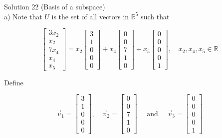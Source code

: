 \documentclass[10pt]{article}
\begin{document}
Solution 22 (Basis of a subspace)\\
a) Note that $U$ is the set of all vectors in $\mathbb{R}^{5}$ such that

$$
\left[\begin{array}{c}
3 x_{2} \\
x_{2} \\
7 x_{4} \\
x_{4} \\
x_{5}
\end{array}\right]=x_{2}\left[\begin{array}{l}
3 \\
1 \\
0 \\
0 \\
0
\end{array}\right]+x_{4}\left[\begin{array}{l}
0 \\
0 \\
7 \\
1 \\
0
\end{array}\right]+x_{5}\left[\begin{array}{l}
0 \\
0 \\
0 \\
0 \\
1
\end{array}\right], \quad x_{2}, x_{4}, x_{5} \in \mathbb{R}
$$

Define

$$
\vec{v}_{1}=\left[\begin{array}{l}
3 \\
1 \\
0 \\
0 \\
0
\end{array}\right], \quad \vec{v}_{2}=\left[\begin{array}{l}
0 \\
0 \\
7 \\
1 \\
0
\end{array}\right] \quad \text { and } \quad \vec{v}_{3}=\left[\begin{array}{l}
0 \\
0 \\
0 \\
0 \\
1
\end{array}\right]
$$
\end{document}
